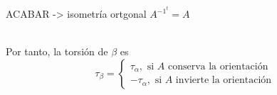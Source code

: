 \begin{sol}[35]
ACABAR -> isometría ortgonal $A^{-1}^t = A$\\\

  Por tanto, la torsión de $\beta$ es
  \[ 
    \tau_{\beta} =
    \begin{cases}
      \tau_{\alpha}, \text{ si $A$ conserva la orientación} \\
      -\tau_{\alpha}, \text{ si $A$ invierte la orientación}
    \end{cases}
  \] 
\end{sol}
